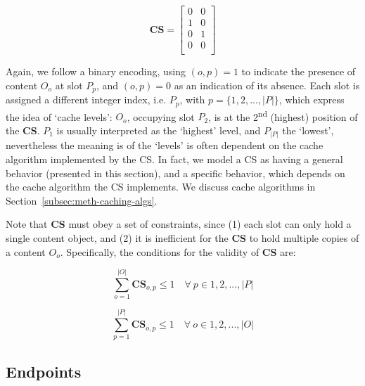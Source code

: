 \begin{equation}
\textbf{CS} = \begin{bmatrix} 0 & 0             \\ 
                1 & 0                           \\ 
                0 & 1                           \\ 
                0 & 0                           \\ \end{bmatrix}
    \label{eq:cs}
\end{equation}\shortvertbreak

Again, we follow a binary encoding, using $(o, p) = 1$ to indicate the 
presence of content $O_o$ at slot $P_p$, and $(o, p) = 0$ as an indication of 
its absence. Each slot is assigned a different integer 
index, i.e. $P_p$, with $p = \{1, 2, ..., |P|\}$, which express the idea of `cache levels': 
$O_o$, occupying slot $P_2$, is at the 2\textsuperscript{nd} 
(highest) position of the \textbf{CS}. $P_1$ is usually interpreted as the `highest' 
level, and $P_{|P|}$ the `lowest', nevertheless the meaning is of the `levels' 
is often dependent on the cache algorithm implemented by the CS. In fact, we 
model a CS as having a general behavior (presented in this section), and a specific 
behavior, which depends on the cache algorithm the CS implements. We discuss cache 
algorithms in Section~\ref{subsec:meth-caching-algs}.\shortvertbreak

Note that \textbf{CS} must obey a set of constraints, since (1) 
each slot can only hold a single content object, and (2) it is inefficient for 
the \textbf{CS} to hold multiple copies of a content $O_o$. Specifically, the 
conditions for the validity of \textbf{CS} are:

\begin{equation}
    \sum_{o=1}^{|O|} \textbf{CS}_{o,p} \le 1 \quad \forall \ p \in {1, 2, ..., |P|}
    \label{eq:cs-constraints-1}
\end{equation}

\begin{equation}
    \sum_{p=1}^{|P|} \textbf{CS}_{o,p} \le 1 \quad \forall \ o \in {1, 2, ..., |O|}
    \label{eq:cs-constraints-2}
\end{equation}

\subsection{Endpoints}
\label{subsec:meth-endpoints}

